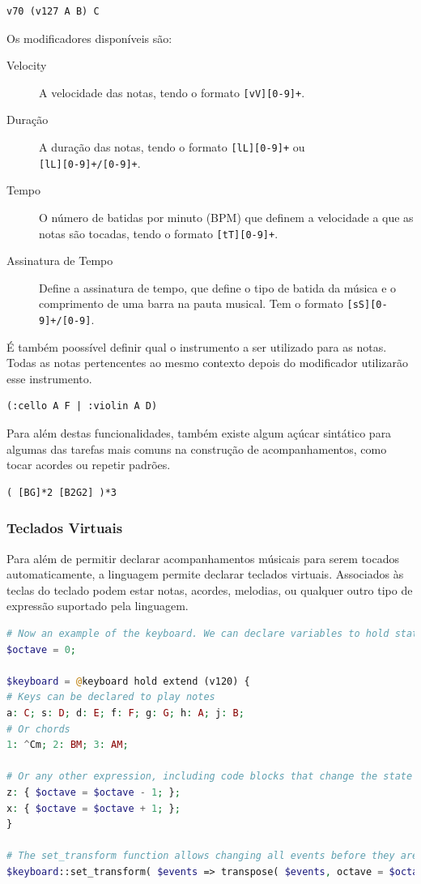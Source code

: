 \begin{lstlisting}
v70 (v127 A B) C
\end{lstlisting}

Os modificadores disponíveis são:
\begin{description}
\item[Velocity] A velocidade das notas, tendo o formato \texttt{[vV][0-9]+}.
\item[Duração] A duração das notas, tendo o formato \texttt{[lL][0-9]+} ou \\ \texttt{[lL][0-9]+/[0-9]+}.
\item[Tempo] O número de batidas por minuto (BPM) que definem a velocidade a que as notas são tocadas, tendo o formato \texttt{[tT][0-9]+}.
\item[Assinatura de Tempo] Define a assinatura de tempo, que define o tipo de batida da música e o comprimento de uma barra na pauta musical. Tem o formato \texttt{[sS][0-9]+/[0-9]}.
\end{description}

É também poossível definir qual o instrumento a ser utilizado para as notas. Todas as notas pertencentes ao mesmo contexto depois do modificador utilizarão esse instrumento.

\begin{lstlisting}
(:cello A F | :violin A D)
\end{lstlisting}

Para além destas funcionalidades, também existe algum açúcar sintático para algumas das tarefas mais comuns na construção de acompanhamentos, como tocar acordes ou repetir padrões.

\begin{lstlisting}
( [BG]*2 [B2G2] )*3
\end{lstlisting}

\subsubsection{Teclados Virtuais}
Para além de permitir declarar acompanhamentos músicais para serem tocados automaticamente, a linguagem permite declarar teclados virtuais. Associados às teclas do teclado podem estar notas, acordes, melodias, ou qualquer outro tipo de expressão suportado pela linguagem.


\begin{lstlisting}[caption=Exemplo da sintaxe de teclados virtuais,language=PHP]
# Now an example of the keyboard. We can declare variables to hold state
$octave = 0;

$keyboard = @keyboard hold extend (v120) {
# Keys can be declared to play notes
a: C; s: D; d: E; f: F; g: G; h: A; j: B;
# Or chords
1: ^Cm; 2: BM; 3: AM;
    
# Or any other expression, including code blocks that change the state
z: { $octave = $octave - 1; };
x: { $octave = $octave + 1; };
}

# The set_transform function allows changing all events before they are emitted by this keyboard
$keyboard::set_transform( $events => transpose( $events, octave = $octave ) );
\end{lstlisting}

